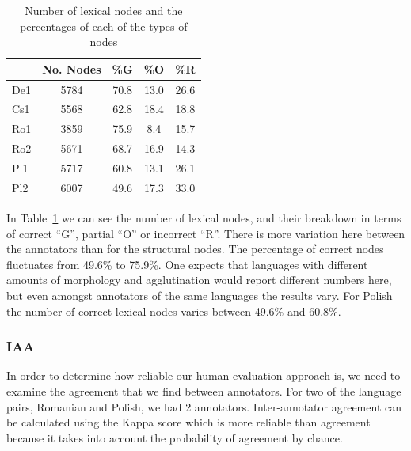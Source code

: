 \documentclass[11pt]{article}
\begin{document}
\begin{table}[h!]
\begin{center}
      \begin{tabular}{|l|c|c|c|c|}
      \hline
   & \bf{No. Nodes} & \bf{\%G} & \bf{\%O}  & \bf{\%R} \\
\hline                               
    De1  & 5784  &  70.8 & 13.0 & 26.6  \\ 
    Cs1  & 5568 &  62.8 & 18.4 & 18.8 \\ 
    Ro1  & 3859 &  75.9 & 8.4 & 15.7  \\ 
    Ro2  & 5671 &  68.7 & 16.9 & 14.3 \\ 
    Pl1  & 5717 &  60.8 & 13.1 & 26.1 \\ 
    Pl2  & 6007 &  49.6  & 17.3 & 33.0 \\ 
      \hline
    \end{tabular}
\end{center}
\normalsize
\vspace*{-3ex}
\caption{Number of lexical  nodes and the percentages of each of the types of nodes
}
\label{tab:stat-lex}
\end{table}

In Table~\ref{tab:stat-lex} we can see the number of lexical nodes, and their
breakdown in terms of correct  ``G'', partial ``O'' or incorrect ``R''. 
There is more variation here between the annotators than for the
structural nodes. The percentage of correct nodes fluctuates from 49.6\%
to 75.9\%. One expects that  languages with different amounts of 
morphology and agglutination would report different numbers here,
but even amongst annotators of the same languages the results vary.
For Polish the number of correct lexical 
nodes
varies between 49.6\%
and 60.8\%.

\subsubsection{IAA}

In order to determine how reliable our human evaluation approach is, we need to
examine the agreement that we find between annotators.
For two of the language pairs, Romanian and Polish, we had 2 annotators. 
 Inter-annotator agreement can be calculated 
using the Kappa score which is more reliable than agreement because it takes into
account the probability of agreement by chance. 

\end{document}
